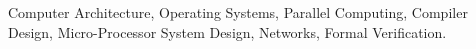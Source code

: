 
\begin{cventries}
\cventry
    {} %
    {} %
    {} %
    {} %
    {
      \begin{cvitems} %
         \item {Computer Architecture, Operating Systems, Parallel Computing, Compiler Design, Micro-Processor System Design, Networks, Formal Verification.}        
      \end{cvitems}
    }
  
\end{cventries}
